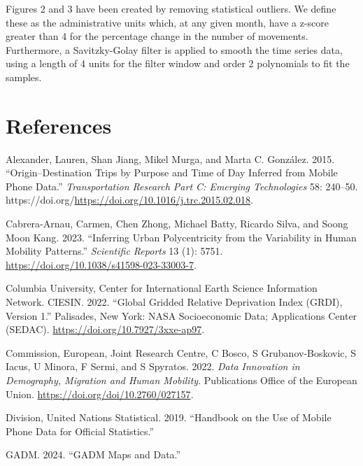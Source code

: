 \documentclass[
  11pt,
]{article}
\newlength{\cslhangindent}
\newlength{\cslentryspacingunit} %
\newenvironment{CSLReferences}[2] %
 {%
  \setlength{\parindent}{0pt}
  \ifodd #1
  \let\oldpar\par
  \def\par{\hangindent=\cslhangindent\oldpar}
  \fi
  \setlength{\parskip}{#2\cslentryspacingunit}
 }%
 {}
\begin{document}
Figures 2 and 3 have been created by removing statistical outliers. We
define these as the administrative units which, at any given month, have
a z-score greater than 4 for the percentage change in the number of
movements. Furthermore, a Savitzky-Golay filter is applied to smooth the
time series data, using a length of 4 units for the filter window and
order 2 polynomials to fit the samples.

\hypertarget{references}{%
\section*{References}\label{references}}

\hypertarget{refs}{}
\begin{CSLReferences}{1}{0}
\leavevmode{}%
Alexander, Lauren, Shan Jiang, Mikel Murga, and Marta C. González. 2015.
{``Origin--Destination Trips by Purpose and Time of Day Inferred from
Mobile Phone Data.''} \emph{Transportation Research Part C: Emerging
Technologies} 58: 240--50.
https://doi.org/\url{https://doi.org/10.1016/j.trc.2015.02.018}.

\leavevmode{}%
Cabrera-Arnau, Carmen, Chen Zhong, Michael Batty, Ricardo Silva, and
Soong Moon Kang. 2023. {``Inferring Urban Polycentricity from the
Variability in Human Mobility Patterns.''} \emph{Scientific Reports} 13
(1): 5751. \url{https://doi.org/10.1038/s41598-023-33003-7}.

\leavevmode{}%
Columbia University, Center for International Earth Science Information
Network. CIESIN. 2022. {``Global Gridded Relative Deprivation Index
(GRDI), Version 1.''} Palisades, New York: NASA Socioeconomic Data;
Applications Center (SEDAC). \url{https://doi.org/10.7927/3xxe-ap97}.

\leavevmode{}%
Commission, European, Joint Research Centre, C Bosco, S
Grubanov-Boskovic, S Iacus, U Minora, F Sermi, and S Spyratos. 2022.
\emph{Data Innovation in Demography, Migration and Human Mobility}.
Publications Office of the European Union.
\url{https://doi.org/doi/10.2760/027157}.

\leavevmode{}%
Division, United Nations Statistical. 2019. {``Handbook on the Use of
Mobile Phone Data for Official Statistics.''}

\leavevmode{}%
GADM. 2024. {``GADM Maps and Data.''}


\end{CSLReferences}
\end{document}
